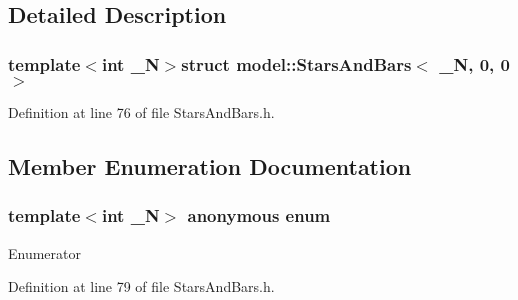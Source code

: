 \subsection{Detailed Description}
\subsubsection*{template$<$int \+\_\+\+N$>$struct model\+::\+Stars\+And\+Bars$<$ \+\_\+\+N, 0, 0 $>$}



Definition at line 76 of file Stars\+And\+Bars.\+h.



\subsection{Member Enumeration Documentation}
\hypertarget{structmodel_1_1_stars_and_bars_3_01___n_00_010_00_010_01_4_a4980ac110787ebdc3f4dabad25a24586}{}\subsubsection[{anonymous enum}]{\setlength{\rightskip}{0pt plus 5cm}template$<$int \+\_\+\+N$>$ anonymous enum}\label{structmodel_1_1_stars_and_bars_3_01___n_00_010_00_010_01_4_a4980ac110787ebdc3f4dabad25a24586}
\begin{Desc}
\item[Enumerator]\par
\begin{description}
\item[{\em 
\hypertarget{structmodel_1_1_stars_and_bars_3_01___n_00_010_00_010_01_4_a4980ac110787ebdc3f4dabad25a24586a9b4f41b3d528ab168c9a68c1f85d9e7d}{}N\label{structmodel_1_1_stars_and_bars_3_01___n_00_010_00_010_01_4_a4980ac110787ebdc3f4dabad25a24586a9b4f41b3d528ab168c9a68c1f85d9e7d}
}]\end{description}
\end{Desc}


Definition at line 79 of file Stars\+And\+Bars.\+h.

